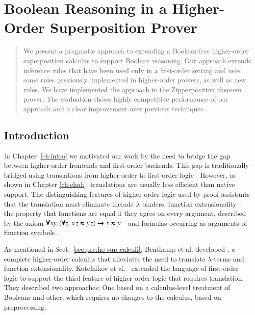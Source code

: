 \chapter{Boolean Reasoning in a Higher-Order Superposition Prover}
\label{ch:bools}




\begin{abstract}
    We present a pragmatic approach to extending a Boolean-free higher-order
    superposition calculus to support Boolean reasoning. Our approach extends
    inference rules that have been used only in a first-order setting and uses some
    rules previously implemented in higher-order provers, as well as new rules.
    We have implemented the approach in the Zipperposition
    theorem prover. The evaluation shows highly competitive performance of our approach
    and a clear improvement over previous techniques.
\end{abstract}

\newpage

\section{Introduction} 
\label{sect:bool:introduction}

In Chapter~\ref{ch:intro} we motivated our work by the need to bridge the gap
between higher-order frontends and first-order backends. This gap is
traditionally bridged using translations from higher-order to
first-order logic \cite{ar-70-hol, mp-08-trans}. However, as shown in Chapter
\ref{ch:ehoh}, translations are usually less efficient than native support. The
distinguishing features of higher-order logic used by proof assistants that the
translation must eliminate include $\lambda$ binders, function
extensionality---the property that functions are equal if they agree on every
argument, described by the axiom $\pmb{\forall} xy. \allowbreak\, (\pmb{\forall} z. \, x
\, z \pmb{\approx} y \,z) \pmb{\rightarrow} x \pmb{\approx} y$---and formulas occurring as arguments of
function symbols \cite{mp-08-trans}.


As mentioned in Sect.~\ref{sec:pre:ho-sup-calculi}, Bentkamp et al. developed
\lsup{}, a complete higher-order calculus that alleviates the need to translate
$\lambda$-terms and function extensionality. Kotelnikov et al.\
\cite{kotelnikov-15-fool,kotelnikov-16-fool} extended the language of
first-order logic to support the third feature of higher-order logic that
requires translation. They described two approaches: One based on a calculus-level
treatment of Booleans and other, which requires no changes to the calculus,
based on preprocessing.

